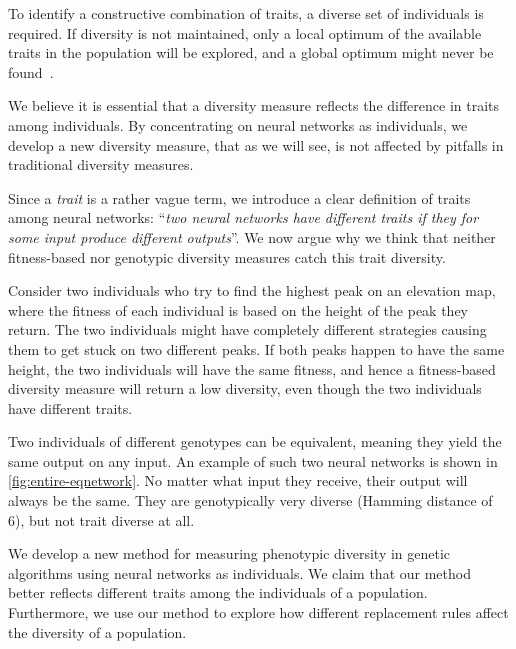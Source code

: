 To identify a constructive combination of traits, a diverse set of individuals is required. If diversity is not maintained, only a local optimum of the available traits in the population will be explored, and a global optimum might never be found~\cite{ursem2002diversity}.

We believe it is essential that a diversity measure reflects the difference in traits among individuals. By concentrating on neural networks as individuals, we develop a new diversity measure, that as we will see, is not affected by pitfalls in traditional diversity measures.

Since a \emph{trait} is a rather vague term, we introduce a clear definition of traits among neural networks: ``\emph{two neural networks have different traits if they for some input produce different outputs}''. We now argue why we think that neither fitness-based nor genotypic diversity measures catch this trait diversity. 

Consider two individuals who try to find the highest peak on an elevation map, where the fitness of each individual is based on the height of the peak they return. The two individuals might have completely different strategies causing them to get stuck on two different peaks. If both peaks happen to have the same height, the two individuals will have the same fitness, and hence a fitness-based diversity measure will return a low diversity, even though the two individuals have different traits.

Two individuals of different genotypes can be equivalent, meaning they yield the same output on any input. An example of such two neural networks is shown in \cref{fig:entire-eqnetwork}. No matter what input they receive, their output will always be the same. They are genotypically very diverse (Hamming distance of 6), but not trait diverse at all.
%

%
We develop a new method for measuring phenotypic diversity in genetic algorithms using neural networks as individuals. We claim that our method better reflects different traits among the individuals of a population. Furthermore, we use our method to explore how different replacement rules affect the diversity of a population.
